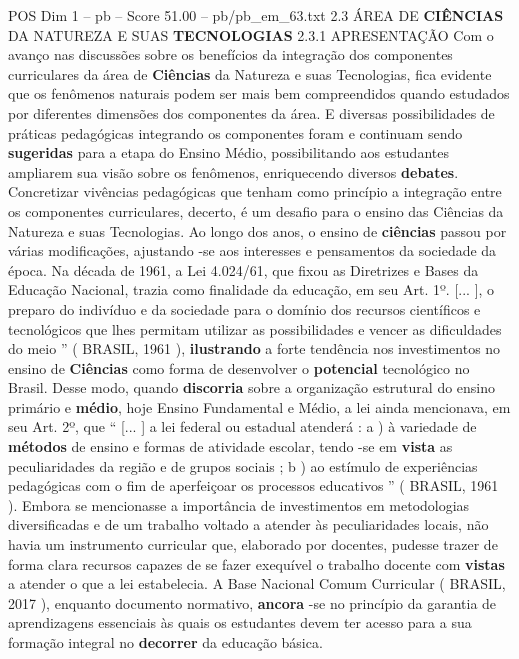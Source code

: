 \begin{textsample}{POS Dim 1 – pb – Score 51.00 – pb/pb\_em\_63.txt}  \label{ex:f1_pos_149}
2.3 ÁREA DE \textbf{CIÊNCIAS} DA NATUREZA E SUAS \textbf{TECNOLOGIAS} 2.3.1 APRESENTAÇÃO Com o avanço nas discussões sobre os benefícios da integração dos componentes curriculares da área de \textbf{Ciências} da Natureza e suas Tecnologias, fica evidente que os fenômenos naturais podem ser mais bem compreendidos quando estudados por diferentes dimensões dos componentes da área.
E diversas possibilidades de práticas pedagógicas integrando os componentes foram e continuam sendo \textbf{sugeridas} para a etapa do Ensino Médio, possibilitando aos estudantes ampliarem sua visão sobre os fenômenos, enriquecendo diversos \textbf{debates}.
Concretizar vivências pedagógicas que tenham como princípio a integração entre os componentes curriculares, decerto, é um desafio para o ensino das Ciências da Natureza e suas Tecnologias.
Ao longo dos anos, o ensino de \textbf{ciências} passou por várias modificações, ajustando -se aos interesses e pensamentos da sociedade da época.
Na década de 1961, a Lei 4.024/61, que fixou as Diretrizes e Bases da Educação Nacional, trazia como finalidade da educação, em seu Art. 1º. [... ], o preparo do indivíduo e da sociedade para o domínio dos recursos científicos e tecnológicos que lhes permitam utilizar as possibilidades e vencer as dificuldades do meio ” ( BRASIL, 1961 ), \textbf{ilustrando} a forte tendência nos investimentos no ensino de \textbf{Ciências} como forma de desenvolver o \textbf{potencial} tecnológico no Brasil.
Desse modo, quando \textbf{discorria} sobre a organização estrutural do ensino primário e \textbf{médio}, hoje Ensino Fundamental e Médio, a lei ainda mencionava, em seu Art. 2º, que “ [... ] a lei federal ou estadual atenderá : a ) à variedade de \textbf{métodos} de ensino e formas de atividade escolar, tendo -se em \textbf{vista} as peculiaridades da região e de grupos sociais ; b ) ao estímulo de experiências pedagógicas com o fim de aperfeiçoar os processos educativos ” ( BRASIL, 1961 ).
Embora se mencionasse a importância de investimentos em metodologias diversificadas e de um trabalho voltado a atender às peculiaridades locais, não havia um instrumento curricular que, elaborado por docentes, pudesse trazer de forma clara recursos capazes de se fazer exequível o trabalho docente com \textbf{vistas} a atender o que a lei estabelecia.
A Base Nacional Comum Curricular ( BRASIL, 2017 ), enquanto documento normativo, \textbf{ancora} -se no princípio da garantia de aprendizagens essenciais às quais os estudantes devem ter acesso para a sua formação integral no \textbf{decorrer} da educação básica.

\end{textsample}
